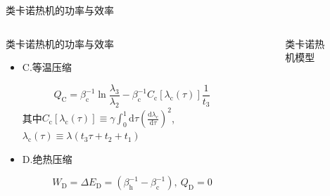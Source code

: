 \documentclass{beamer}
\newcommand{\DD}[2]{\frac{\mathrm{d} #1}{\mathrm{d} #2}}
\begin{document}
\begin{frame}{类卡诺热机的功率与效率}
    \begin{columns}
        \begin{column}{.7\textwidth}
            \begin{block}{类卡诺热机的功率与效率}
            \begin{itemize}
            \item<2-> C.等温压缩

            \begin{equation}
                Q_{\mathrm{C}} = \beta_{\mathrm{c}}^{-1} \ln{\frac{\lambda_3}{\lambda_2}} - \beta_{\mathrm{c}}^{-1} C_{\mathrm{c}} [\lambda_{\mathrm{c}}(\tau)] \frac{1}{t_3}
                \label{eq3.18}
            \end{equation}
            其中$C_{\mathrm{c}} [\lambda_{\mathrm{c}}(\tau)]\equiv \gamma \int_{0}^{1} \mathrm{d} \tau    \left(\DD{\lambda_{c}}{\tau}\right)^2$,$\lambda_{\mathrm{c}}(\tau)\equiv\lambda(t_3 \tau + t_2 +t_1)$
            \item<3-> D.绝热压缩
            
            \begin{equation}
                W_{\mathrm{D}} = \Delta E_{\mathrm{D}} = (\beta_{\mathrm{h}}^{-1} - \beta_{\mathrm{c}}^{-1}),\  Q_{\mathrm{D}}=0
                \label{eq3.19}
            \end{equation}
            \end{itemize}
            \end{block}          
        \end{column}
        \begin{column}{.4\textwidth}
        \begin{figure}
            \centering
            \def\svgwidth{\columnwidth}
            
            \setcounter{figure}{2}
            \caption{类卡诺热机模型}
            \end{figure}
        \end{column}   
    \end{columns}
\end{frame}
\end{document}
